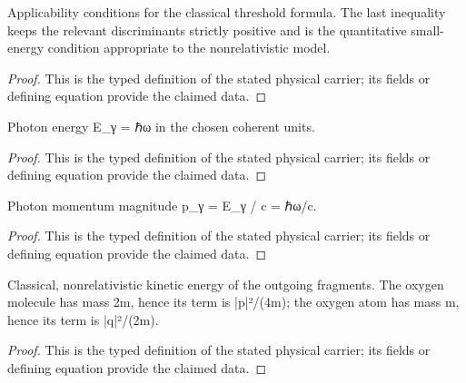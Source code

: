 \begin{definition}
  \label{def:physics:IPhO_2026_1_C_1:aux005}
  Applicability conditions for the classical threshold formula. The last inequality keeps the relevant discriminants strictly positive and is the quantitative small-energy condition appropriate to the nonrelativistic model.
\end{definition}
\begin{proof}
  This is the typed definition of the stated physical carrier; its fields or defining equation provide the claimed data.
\end{proof}

\begin{definition}
  \label{def:physics:IPhO_2026_1_C_1:aux006}
  Photon energy E\_γ = ℏω in the chosen coherent units.
\end{definition}
\begin{proof}
  This is the typed definition of the stated physical carrier; its fields or defining equation provide the claimed data.
\end{proof}

\begin{definition}
  \label{def:physics:IPhO_2026_1_C_1:aux007}
  Photon momentum magnitude p\_γ = E\_γ / c = ℏω/c.
\end{definition}
\begin{proof}
  This is the typed definition of the stated physical carrier; its fields or defining equation provide the claimed data.
\end{proof}

\begin{definition}
  \label{def:physics:IPhO_2026_1_C_1:aux008}
  Classical, nonrelativistic kinetic energy of the outgoing fragments. The oxygen molecule has mass 2m, hence its term is |p|²/(4m); the oxygen atom has mass m, hence its term is |q|²/(2m).
\end{definition}
\begin{proof}
  This is the typed definition of the stated physical carrier; its fields or defining equation provide the claimed data.
\end{proof}

